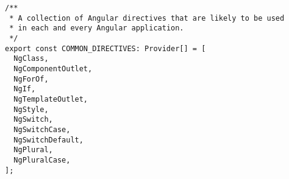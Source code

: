 \begin{verbatim}
/**
 * A collection of Angular directives that are likely to be used
 * in each and every Angular application.
 */
export const COMMON_DIRECTIVES: Provider[] = [
  NgClass,
  NgComponentOutlet,
  NgForOf,
  NgIf,
  NgTemplateOutlet,
  NgStyle,
  NgSwitch,
  NgSwitchCase,
  NgSwitchDefault,
  NgPlural,
  NgPluralCase,
];
\end{verbatim}
